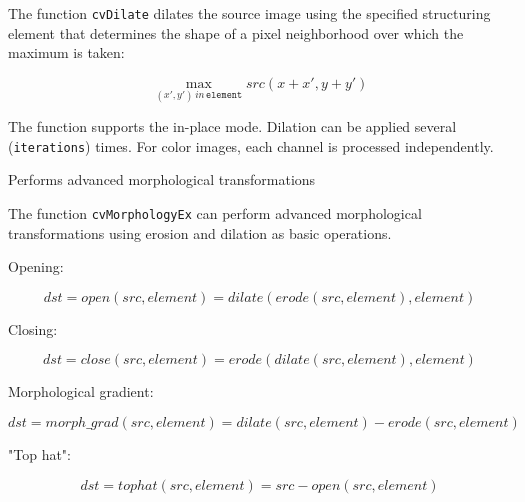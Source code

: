 The function \texttt{cvDilate} dilates the source image using the specified structuring element that determines the shape of a pixel neighborhood over which the maximum is taken:

\[
\max_{(x',y') \, in \, \texttt{element}}src(x+x',y+y')
\]

The function supports the in-place mode. Dilation can be applied several (\texttt{iterations}) times. For color images, each channel is processed independently.

\label{MorphologyEx}

Performs advanced morphological transformations


\begin{description}
\begin{description}
\end{description}
\end{description}

The function \texttt{cvMorphologyEx} can perform advanced morphological transformations using erosion and dilation as basic operations.

Opening:

\[
dst=open(src,element)=dilate(erode(src,element),element)
\]

Closing:

\[
dst=close(src,element)=erode(dilate(src,element),element)
\]

Morphological gradient:

\[
dst=morph\_grad(src,element)=dilate(src,element)-erode(src,element)
\]

"Top hat":

\[
dst=tophat(src,element)=src-open(src,element)
\]

